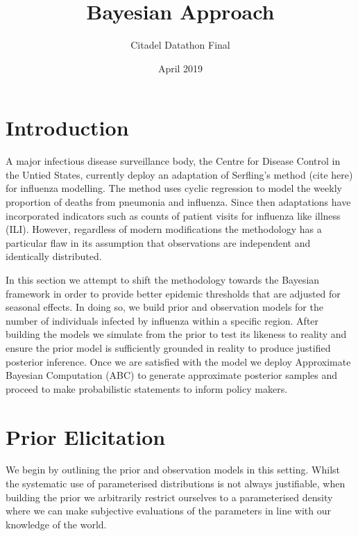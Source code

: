 \documentclass{article}
\title{Bayesian Approach}
\author{Citadel Datathon Final }
\date{April 2019}
\begin{document}
\maketitle

\section{Introduction}

A major infectious disease surveillance body, the Centre for Disease Control in the Untied States, currently deploy an adaptation of Serfling's method (cite here) for influenza modelling. The method uses cyclic regression to model the weekly proportion of deaths from pneumonia and influenza. Since then adaptations have incorporated indicators such as counts of patient visits for influenza like illness (ILI). However, regardless of modern modifications the methodology has a particular flaw in its assumption that observations are independent and identically distributed.

In this section we attempt to shift the methodology towards the Bayesian framework in order to provide better epidemic thresholds that are adjusted for seasonal effects. In doing so, we build prior and observation models for the number of individuals infected by influenza within a specific region. After building the models we simulate from the prior to test its likeness to reality and ensure the prior model is sufficiently grounded in reality to produce justified posterior inference. Once we are satisfied with the model we deploy Approximate Bayesian Computation (ABC) to generate approximate posterior samples and proceed to make probabilistic statements to inform policy makers. 

\section{Prior Elicitation}
We begin by outlining the prior and observation models in this setting. Whilst the systematic use of parameterised distributions is not always justifiable, when building the prior we arbitrarily restrict ourselves to a parameterised density where we can make subjective evaluations of the parameters in line with our knowledge of the world.
\end{document}
